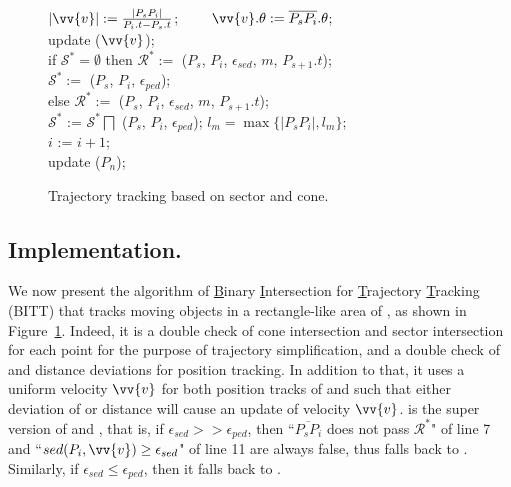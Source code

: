 \begin{figure}[tb!]
\begin{center}
{\begin{minipage}{3.3in}
{					\icc \>\hspace{7ex}    $|\vv{v}|:=\frac{|P_sP_{i}|}{P_{i}.t-P_s.t}$; ~~~~$\vv{v}.\theta:=\overline{P_sP_{i}}.\theta$; \\
					\icc \>\hspace{7ex}    update ($\vv{v}$); \\
					\icc \>\hspace{3ex} if $\mathcal{S}^*=\emptyset$ then $\mathcal{R}^*:=$ ($P_s$, $P_{i}$, $\epsilon_{sed}$, $m$, $P_{s+1}.t$); \\
					\icc \>\hspace{7ex}    $\mathcal{S}^*:=$ ($P_s$, $P_{i}$, $\epsilon_{ped}$); \\
					\icc \>\hspace{3ex} else $\mathcal{R}^*:=$ ($P_s$, $P_{i}$, $\epsilon_{sed}$, $m$, $P_{s+1}.t$); \\
					\icc \>\hspace{7ex}    $\mathcal{S}^*$ := $\mathcal{S}^*\bigsqcap$ ($P_s$, $P_{i}$, $\epsilon_{ped}$); $l_{m} = \max\{|P_sP_{i}|, l_{m}\}$;\\
					\icc \>\hspace{3ex} $i$ := $i +1$;\\
					\icc \>\hspace{0ex} update ($P_{n}$); 
				}
				\vspace{-2ex}
				\myhrule
			\end{minipage}
		}
	\end{center}
	\vspace{-2ex}
	\caption{\small Trajectory tracking based on sector and cone.}
	\label{alg:bitt}
	\vspace{-2ex}
\end{figure}

\subsection{Implementation.}
We now present the algorithm of \underline{B}inary \underline{I}ntersection for \underline{T}rajectory \underline{T}racking (BITT) that tracks moving objects in a rectangle-like area of \bed, as shown in Figure~\ref{alg:bitt}. 
%
Indeed, it is a double check of cone intersection and sector intersection for each point for the purpose of trajectory simplification, and a double check of \sed and \ped distance deviations for position tracking. In addition to that, it uses a uniform velocity $\vv{v}$ for both position tracks of \sed and \ped such that either deviation of \ped or \sed distance will cause an update of velocity $\vv{v}$. 
%
\bitt is the super version of \citt and \sitt, that is, if $\epsilon_{sed} >> \epsilon_{ped}$, then ``$\overline{P_sP_{i}}$ does not pass $\mathcal{R}^*$" of line 7 and ``$sed(P_i, \vv{v}) \ge \epsilon_{sed}$" of line 11 are always false, thus \bitt falls back to \sitt. {Similarly, if $\epsilon_{sed} \le \epsilon_{ped}$, then it falls back to \citt.}

